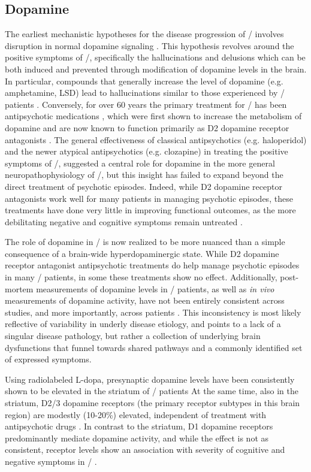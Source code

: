 \subsection{Dopamine}
\label{sec:intro:scz:dopamine}
The earliest mechanistic hypotheses for the disease progression of \scz/ involves disruption in normal dopamine signaling \citep{Matthysse1973}.
This hypothesis revolves around the positive symptoms of \scz/, specifically the hallucinations and delusions which can be both induced and prevented through modification of dopamine levels in the brain.
In particular, compounds that generally increase the level of dopamine (e.g. amphetamine, LSD) lead to hallucinations similar to those experienced by \scz/ patients \citep{Angrist1994, Lieberman1987}.
Conversely, for over 60 years the primary treatment for \scz/ has been antipsychotic medications \citep{Delay1952}, which were first shown to increase the metabolism of dopamine \citep{Carlsson1963} and are now known to function primarily as D2 dopamine receptor antagonists \citep{Kapur2003}.
The general effectiveness of classical antipsychotics (e.g. haloperidol) and the newer atypical antipsychotics (e.g. clozapine) in treating the positive symptoms of \scz/, suggested a central role for dopamine in the more general neuropathophysiology of \scz/, but this insight has failed to expand beyond the direct treatment of psychotic episodes.
Indeed, while D2 dopamine receptor antagonists work well for many patients in managing psychotic episodes, these treatments have done very little in improving functional outcomes, as the more debilitating negative and cognitive symptoms remain untreated \citep{Insel2010a}.

The role of dopamine in \scz/ is now realized to be more nuanced than a simple consequence of a brain-wide hyperdopaminergic state.
While D2 dopamine receptor antagonist antipsychotic treatments do help manage psychotic episodes in many \scz/ patients, in some these treatments show no effect.
Additionally, post-mortem measurements of dopamine levels in \scz/ patients, as well as \emph{in vivo} measurements of dopamine activity, have not been entirely consistent across studies, and more importantly, across patients \citep{Davis1991}.
This inconsistency is most likely reflective of variability in underly disease etiology, and points to a lack of a singular disease pathology, but rather a collection of underlying brain dysfunctions that funnel towards shared pathways and a commonly identified set of expressed symptoms.

Using radiolabeled L-dopa, presynaptic dopamine levels have been consistently shown to be elevated in the striatum of \scz/ patients \citep[for review, see][]{Howes2007}
At the same time, also in the striatum, D2/3 dopamine receptors (the primary receptor subtypes in this brain region) are modestly (10-20\%) elevated, independent of treatment with antipsychotic drugs \citep[for review, see][]{Howes2009}.
In contrast to the striatum, D1 dopamine receptors predominantly mediate dopamine activity, and while the effect is not as consistent, receptor levels show an association with severity of cognitive and negative symptoms in \scz/ \citep{Goldman-Rakic2004}.

